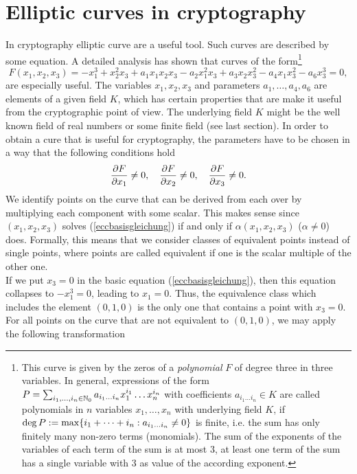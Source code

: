 \section{Elliptic curves in cryptography}\label{ECC-Crypto}

In cryptography elliptic curve are a useful tool. Such curves are described by some equation. A detailed analysis has shown that curves of the form\footnote{This curve is given by the zeros of a {\it polynomial} $F$ of degree three in three variables. In general, expressions of the form
$P=\sum_{i_1,\dots,i_n\in\mathbb{N}_0} a_{i_1\dots i_n} x_1^{i_1}\dots x_n^{i_n}$ with coefficients $a_{i_1\dots i_n}\in K$ are called polynomials in $n$ variables $x_1,\dots,x_n$ with underlying field $K$, if ${\rm deg\,} P:=\max\{i_1+\dots +i_n: a_{i_1\dots i_n}\ne 0\}$ is finite, i.e. the sum has only finitely many non-zero terms (monomials). The sum of the exponents of the variables of each term of the sum is at most $3$, at least one term of the sum has a single variable with $3$ as value of the according exponent.}
\begin{equation}
 F(x_1,x_2,x_3)=-x_1^3+x_2^2x_3+a_1x_1x_2x_3-a_2x_1^2x_3+a_3x_2x_3^2-a_4x_1x_3^2-a_6x_3^3=0,
\label{eccbasisgleichung}
\end{equation}
are especially useful. The variables $x_1,x_2,x_3$ and parameters $a_1,\dots,a_4,a_6$ are elements of a given field $K$, which has certain properties that are make it useful from the cryptographic point of view. The underlying field $K$ might be the well known field of real numbers or some finite field (see last section).
In order to obtain a cure that is useful for cryptography, the parameters have to be chosen in a way that the following conditions hold
$$ {\partial F\over\partial x_1}\ne 0, \quad {\partial F\over\partial x_2}\ne 0, \quad
{\partial F\over\partial x_3}\ne 0 .
$$
We identify points on the curve that can be derived from each over by multiplying each component with some scalar. This makes sense since $(x_1,x_2,x_3)$ solves (\ref{eccbasisgleichung}) if and only if $\alpha (x_1,x_2,x_3)$ ($\alpha\ne 0$) does. Formally, this means that we consider classes of equivalent points instead of single points, where points are called equivalent if one is the scalar multiple of the other one.
\\ If we put $x_3=0$ in the basic equation (\ref{eccbasisgleichung}), then this equation collapses to $-x_1^3=0$, leading to $x_1=0$. Thus, the equivalence class which includes the element $(0,1,0)$ is the only one that contains a point with $x_3=0$. For all points on the curve that are not equivalent to $(0,1,0)$, we may apply the following transformation
